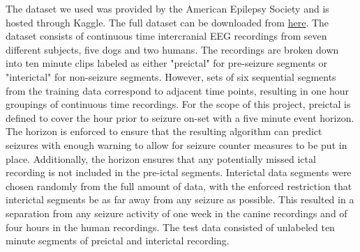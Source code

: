 The dataset we used was provided by the American Epilepsy Society and is hosted through Kaggle.  The full dataset can be downloaded from \href{http://www.kaggle.com/c/seizure-prediction/data}{here}.  The dataset consists of continuous time intercranial EEG recordings from seven different subjects, five dogs and two humans.  The recordings are broken down into ten minute clips labeled as either "preictal" for pre-seizure segments or "interictal" for non-seizure segments.  However, sets of six sequential segments from the training data correspond to adjacent time points, resulting in one hour groupings of continuous time recordings.  For the scope of this project, preictal is defined to cover the hour prior to seizure on-set with a five minute event horizon.  The horizon is enforced to ensure that the resulting algorithm can predict seizures with enough warning to allow for seizure counter measures to be put in place.  Additionally, the horizon ensures that any potentially missed ictal recording is not included in the pre-ictal segments.  Interictal data segments were chosen randomly from the full amount of data, with the enforced restriction that interictal segments be as far away from any seizure as possible.  This resulted in a separation from any seizure activity of one week in the canine recordings and of four hours in the human recordings.  The test data consisted of unlabeled ten minute segments of preictal and interictal recording.
